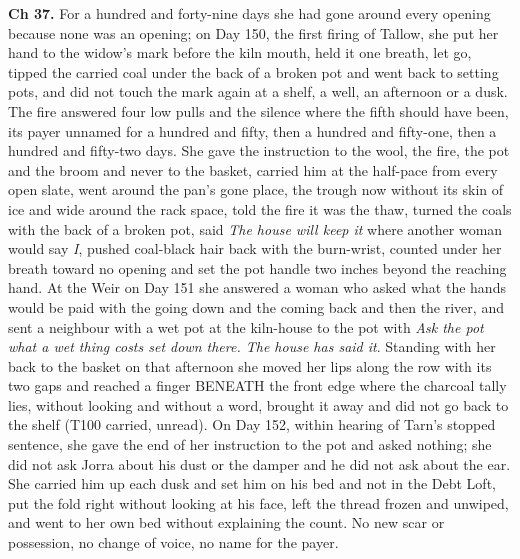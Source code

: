 \documentclass{design/chronicle}
\begin{document}
{\textbf{Ch 37.} For a hundred and forty-nine days she had gone around every opening because none was an opening; on Day 150, the first firing of Tallow, she put her hand to the widow’s mark before the kiln mouth, held it one breath, let go, tipped the carried coal under the back of a broken pot and went back to setting pots, and did not touch the mark again at a shelf, a well, an afternoon or a dusk. The fire answered four low pulls and the silence where the fifth should have been, its payer unnamed for a hundred and fifty, then a hundred and fifty-one, then a hundred and fifty-two days. She gave the instruction to the wool, the fire, the pot and the broom and never to the basket, carried him at the half-pace from every open slate, went around the pan’s gone place, the trough now without its skin of ice and wide around the rack space, told the fire it was the thaw, turned the coals with the back of a broken pot, said \emph{The house will keep it} where another woman would say \emph{I}, pushed coal-black hair back with the burn-wrist, counted under her breath toward no opening and set the pot handle two inches beyond the reaching hand. At the Weir on Day 151 she answered a woman who asked what the hands would be paid with the going down and the coming back and then the river, and sent a neighbour with a wet pot at the kiln-house to the pot with \emph{Ask the pot what a wet thing costs set down there. The house has said it}. Standing with her back to the basket on that afternoon she moved her lips along the row with its two gaps and reached a finger BENEATH the front edge where the charcoal tally lies, without looking and without a word, brought it away and did not go back to the shelf (T100 carried, unread). On Day 152, within hearing of Tarn’s stopped sentence, she gave the end of her instruction to the pot and asked nothing; she did not ask Jorra about his dust or the damper and he did not ask about the ear. She carried him up each dusk and set him on his bed and not in the Debt Loft, put the fold right without looking at his face, left the thread frozen and unwiped, and went to her own bed without explaining the count. No new scar or possession, no change of voice, no name for the payer.

}
\end{document}
